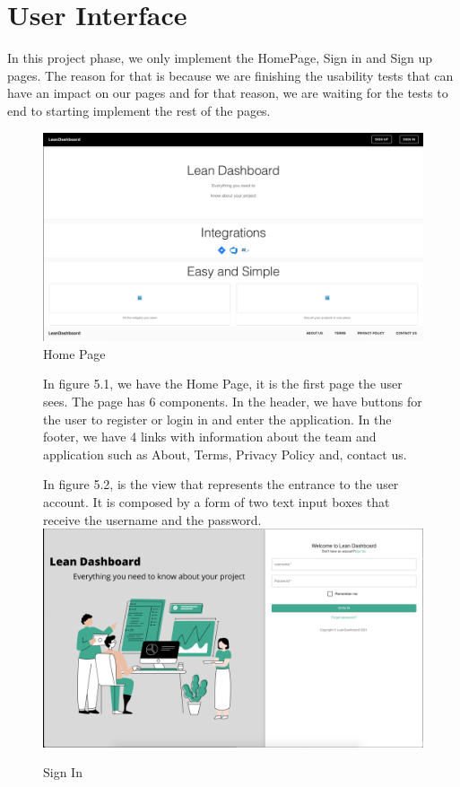 \documentclass[a4paper,twoside,10pt]{report}
\begin{document}
\section{User Interface}
In this project phase, we only implement the HomePage, Sign in and Sign up pages. The reason for that is because we are finishing the usability tests that can have an impact on our pages and for that reason, we are waiting for the tests to end to starting implement the rest of the pages. 
 
\begin{figure}[h!]
\center
    \includegraphics[width=\textwidth]{HomePage.png}
\caption{Home Page}
\end{figure}
\begin{figure}[h!]

In figure 5.1, we have the Home Page, it is the first page the user sees. The page has 6 components. 
In the header, we have buttons for the user to register or login in and enter the application.
In the footer, we have 4 links with information about the team and application such as About, Terms, Privacy Policy and, contact us.
  
 In figure 5.2, is the view that represents the entrance to the user account. It is composed by a form of two text input boxes that receive the username and the password.
\center
    \includegraphics[width=\textwidth]{SignIn.png}
\caption{Sign In}
\end{figure}
\end{document}
